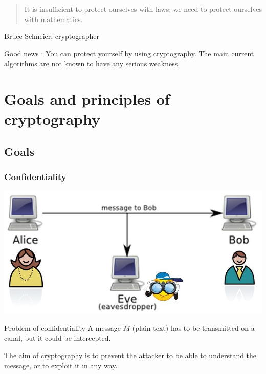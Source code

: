 \documentclass[compress]{beamer}
\theoremstyle{definition}
\theoremstyle{definition}
\theoremstyle{definition}
\theoremstyle{remark}
\theoremstyle{remark}
\theoremstyle{definition}
\theoremstyle{definition}
\theoremstyle{definition}
\theoremstyle{definition}
\theoremstyle{definition}
\theoremstyle{remark}
\theoremstyle{remark}
\theoremstyle{remark}
\theoremstyle{remark}
\begin{document}
%			
			\begin{frame}
				\begin{center}\begin{quote}It is insufficient to protect ourselves with laws; we need to protect ourselves with mathematics.\end{quote}\end{center} Bruce Schneier, cryptographer


				\vspace*{25mm}
				\alert{Good news : You can protect yourself by using cryptography. The main current algorithms are not known to have any serious weakness. }
				
			\end{frame}
		\section{Goals and principles of cryptography}
			\subsection{Goals}
				\subsubsection{Confidentiality}
				\begin{frame}
					\begin{center}\includegraphics[scale=0.8]{./aliceBob.jpg}\end{center}
					\begin{exampleblock}{Problem of confidentiality}
						A message $M$ (plain text) has to be transmitted on a canal, but it could be intercepted. 
						\vspace*{5mm}
						
						The aim of cryptography is to prevent the attacker to be able to understand the message, or to exploit it in any way.
					\end{exampleblock}
				\end{frame}
\end{document}
